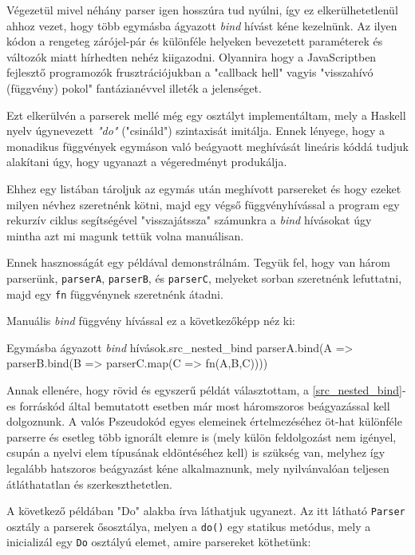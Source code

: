 Végezetül mivel néhány parser igen hosszúra tud nyúlni, így ez elkerülhetetlenül ahhoz vezet, hogy több egymásba ágyazott \textit{bind} hívást kéne kezelnünk. Az ilyen kódon a rengeteg zárójel-pár és különféle helyeken bevezetett paraméterek és változók miatt hírhedten nehéz kiigazodni. Olyannira hogy a JavaScriptben fejlesztő programozók frusztrációjukban a "callback hell" vagyis "visszahívó (függvény) pokol" fantázianévvel illeték a jelenséget.

Ezt elkerülvén a parserek mellé még egy osztályt implementáltam, mely a Haskell nyelv úgynevezett \textit{"do"} ("csináld") szintaxisát imitálja. Ennek lényege, hogy a monadikus függvények egymáson való beágyaott meghívását lineáris kóddá tudjuk alakítani úgy, hogy ugyanazt a végeredményt produkálja.

Ehhez egy listában tároljuk az egymás után meghívott parsereket és hogy ezeket milyen névhez szeretnénk kötni, majd egy végső függvényhívással a program egy rekurzív ciklus segítségével "visszajátssza" számunkra a \textit{bind} hívásokat úgy mintha azt mi magunk tettük volna manuálisan.

Ennek hasznosságát egy példával demonstrálnám. Tegyük fel, hogy van három parserünk, \texttt{parserA}, \texttt{parserB}, és \texttt{parserC}, melyeket sorban szeretnénk lefuttatni, majd egy \texttt{fn} függvénynek szeretnénk átadni.

Manuális \textit{bind} függvény hívással ez a következőképp néz ki:

\begin{code}{Egymásba ágyazott \textit{bind} hívások.}{src_nested_bind}
parserA.bind(A => 
    parserB.bind(B => 
        parserC.map(C => 
            fn(A,B,C))))
\end{code}

Annak ellenére, hogy rövid és egyszerű példát választottam, a \ref{src_nested_bind}-es forráskód által bemutatott esetben már most háromszoros beágyazással kell dolgoznunk. A valós Pszeudokód egyes elemeinek értelmezéséhez öt-hat különféle parserre és esetleg több ignorált elemre is (mely külön feldolgozást nem igényel, csupán a nyelvi elem típusának eldöntéséhez kell) is szükség van, melyhez így legalább hatszoros beágyazást kéne alkalmaznunk, mely nyilvánvalóan teljesen átláthatatlan és szerkeszthetetlen.

A következő példában "Do" alakba írva láthatjuk ugyanezt. Az itt látható \texttt{Parser} osztály a parserek ősosztálya, melyen a \texttt{do()} egy statikus metódus, mely a inicializál egy \texttt{Do} osztályú elemet, amire parsereket köthetünk:

